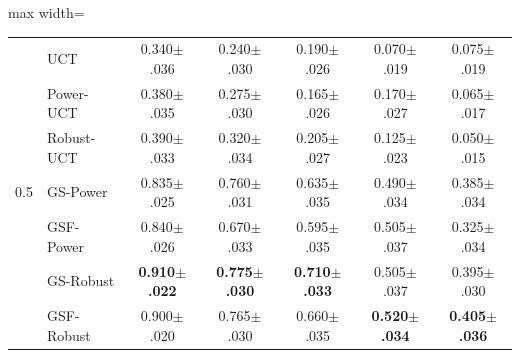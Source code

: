 \begin{table}[t]
\begin{adjustbox}{max width=\linewidth}
\begin{tabular}{llccccc}
\midrule 
\multirow{7}{*}{0.5} & UCT & 0.340{\scriptsize$\pm$.036} & 0.240{\scriptsize$\pm$.030} & 0.190{\scriptsize$\pm$.026} & 0.070{\scriptsize$\pm$.019} & 0.075{\scriptsize$\pm$.019} \\
 & Power-UCT & 0.380{\scriptsize$\pm$.035} & 0.275{\scriptsize$\pm$.030} & 0.165{\scriptsize$\pm$.026} & 0.170{\scriptsize$\pm$.027} & 0.065{\scriptsize$\pm$.017} \\
 & Robust-UCT & 0.390{\scriptsize$\pm$.033} & 0.320{\scriptsize$\pm$.034} & 0.205{\scriptsize$\pm$.027} & 0.125{\scriptsize$\pm$.023} & 0.050{\scriptsize$\pm$.015} \\
 & GS-Power & 0.835{\scriptsize$\pm$.025} & 0.760{\scriptsize$\pm$.031} & 0.635{\scriptsize$\pm$.035} & 0.490{\scriptsize$\pm$.034} & 0.385{\scriptsize$\pm$.034} \\
 & GSF-Power & 0.840{\scriptsize$\pm$.026} & 0.670{\scriptsize$\pm$.033} & 0.595{\scriptsize$\pm$.035} & 0.505{\scriptsize$\pm$.037} & 0.325{\scriptsize$\pm$.034} \\
 & GS-Robust & \textbf{0.910{\scriptsize$\pm$.022}} & \textbf{0.775{\scriptsize$\pm$.030}} & \textbf{0.710{\scriptsize$\pm$.033}} & 0.505{\scriptsize$\pm$.037} & 0.395{\scriptsize$\pm$.030} \\
 & GSF-Robust & 0.900{\scriptsize$\pm$.020} & 0.765{\scriptsize$\pm$.030} & 0.660{\scriptsize$\pm$.035} & \textbf{0.520{\scriptsize$\pm$.034}} & \textbf{0.405{\scriptsize$\pm$.036}} \\
\bottomrule 
\end{tabular}
\end{adjustbox}
\end{table}

